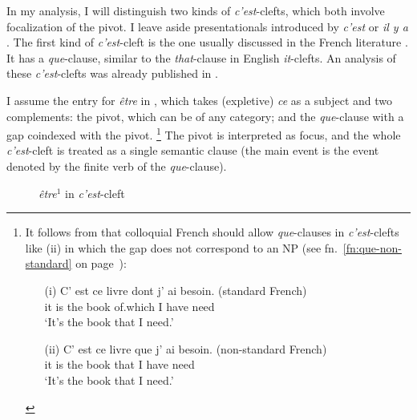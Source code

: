 
In my analysis, I will distinguish two kinds of \emph{c'est}-clefts, which both involve focalization of the pivot. I leave aside presentationals introduced by \emph{c'est} or \emph{il y a} \citep[see][]{Karssenberg.2018}.  The first kind of \emph{c'est}-cleft is the one usually discussed in the French literature \citep{Doetjes.2004}. It has a \emph{que}-clause, similar to the \emph{that}-clause in English \emph{it}-clefts. An analysis of these \emph{c'est}-clefts was already published in \citet{Winckel.2020}.

I assume the entry for \emph{être} in , which takes (expletive) \emph{ce} as a subject and two complements: the pivot, which can be of any category; and the \emph{que}-clause with a gap coindexed with the pivot.%
\footnote{It follows from  that colloquial French should allow \emph{que}-clauses in \emph{c'est}-clefts like (ii) in which the gap does not correspond to an NP (see fn.~\ref{fn:que-non-standard} on page~\pageref{fn:que-non-standard}):

\begin{itemize}
    \item[(i)] \gll C' est ce livre dont j' ai besoin. (standard French)\\
it is the book of.which I have need\\
\glt `It's the book that I need.'
    \item[(ii)] \gll C' est ce livre que j' ai besoin. (non-standard French)\\
it is the book that I have need\\
\glt `It's the book that I need.'
\label{ex:cleft-colloquial}
\end{itemize}

}
The pivot is interpreted as focus, and the whole \emph{c'est}-cleft is treated as a single semantic clause (the main event is the event denoted by the finite verb of the \emph{que}-clause).

\begin{figure}
\caption{\emph{être}$^1$ in \textit{c'est}-cleft}\label{ex:etre-cleft-entry}
\end{figure} 

